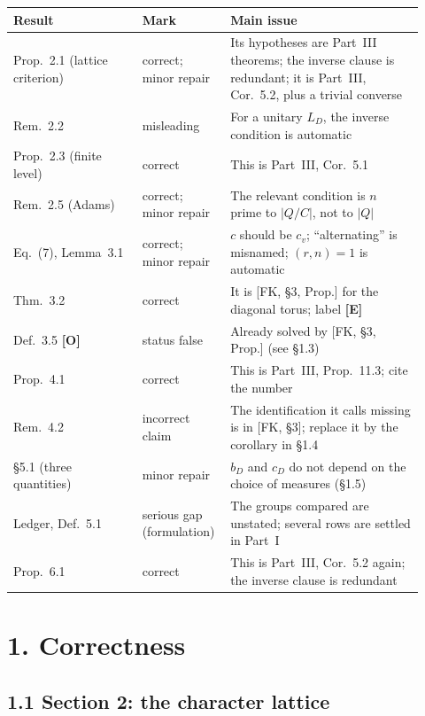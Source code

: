 \documentclass[11pt]{article}
\theoremstyle{definition}
\begin{document}
\begin{center}\small
\begin{tabular}{@{}p{0.30\linewidth}p{0.17\linewidth}p{0.45\linewidth}@{}}
\toprule
Result & Mark & Main issue\\\midrule
Prop.~2.1 (lattice criterion) & correct; minor repair & Its hypotheses are Part~III theorems; the inverse clause is redundant; it is Part~III, Cor.~5.2, plus a trivial converse\\
Rem.~2.2 & misleading & For a unitary $L_D$, the inverse condition is automatic\\
Prop.~2.3 (finite level) & correct & This is Part~III, Cor.~5.1\\
Rem.~2.5 (Adams) & correct; minor repair & The relevant condition is $n$ prime to $|Q/C|$, not to $|Q|$\\
Eq.~(7), Lemma~3.1 & correct; minor repair & $c$ should be $c_v$; ``alternating'' is misnamed; $(r,n)=1$ is automatic\\
Thm.~3.2 & correct & It is [FK, \S3, Prop.] for the diagonal torus; label \textbf{[E]}\\
Def.~3.5 \textbf{[O]} & status false & Already solved by [FK, \S3, Prop.] (see \S1.3)\\
Prop.~4.1 & correct & This is Part~III, Prop.~11.3; cite the number\\
Rem.~4.2 & incorrect claim & The identification it calls missing is in [FK, \S3]; replace it by the corollary in \S1.4\\
\S5.1 (three quantities) & minor repair & $b_D$ and $c_D$ do not depend on the choice of measures (\S1.5)\\
Ledger, Def.~5.1 & serious gap (formulation) & The groups compared are unstated; several rows are settled in Part~I\\
Prop.~6.1 & correct & This is Part~III, Cor.~5.2 again; the inverse clause is redundant\\
\bottomrule
\end{tabular}
\end{center}

\section*{1. Correctness}

\subsection*{1.1 Section 2: the character lattice}
\end{document}
